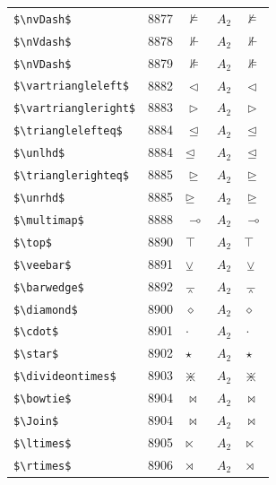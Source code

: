 ﻿\documentclass{article}
\begin{document}
\begin{table}
\begin{center}
\begin{tabular}{llll}
 \verb#$\nvDash$#           & 8877    & $\nvDash$           & $A_2\quad \nvDash$\\
 \verb#$\nVdash$#           & 8878    & $\nVdash$           & $A_2\quad \nVdash$\\
 \verb#$\nVDash$#           & 8879    & $\nVDash$           & $A_2\quad \nVDash$\\
 \verb#$\vartriangleleft$#  & 8882    & $\vartriangleleft$  & $A_2\quad \vartriangleleft$\\
 \verb#$\vartriangleright$# & 8883    & $\vartriangleright$ & $A_2\quad \vartriangleright$\\
 \verb#$\trianglelefteq$#   & 8884    & $\trianglelefteq$   & $A_2\quad \trianglelefteq$\\
 \verb#$\unlhd$#            & 8884    & $\unlhd$            & $A_2\quad \unlhd$\\
 \verb#$\trianglerighteq$#  & 8885    & $\trianglerighteq$  & $A_2\quad \trianglerighteq$\\
 \verb#$\unrhd$#            & 8885    & $\unrhd$            & $A_2\quad \unrhd$\\
 \verb#$\multimap$#         & 8888    & $\multimap$         & $A_2\quad \multimap$\\
 \verb#$\top$#              & 8890    & $\top$              & $A_2\quad \top$\\
 \verb#$\veebar$#           & 8891    & $\veebar$           & $A_2\quad \veebar$\\
 \verb#$\barwedge$#         & 8892    & $\barwedge$         & $A_2\quad \barwedge$\\
 \verb#$\diamond$#          & 8900    & $\diamond$          & $A_2\quad \diamond$\\
 \verb#$\cdot$#             & 8901    & $\cdot$             & $A_2\quad \cdot$\\
 \verb#$\star$#             & 8902    & $\star$             & $A_2\quad \star$\\
 \verb#$\divideontimes$#    & 8903    & $\divideontimes$    & $A_2\quad \divideontimes$\\
 \verb#$\bowtie$#           & 8904    & $\bowtie$           & $A_2\quad \bowtie$\\
 \verb#$\Join$#             & 8904    & $\Join$             & $A_2\quad \Join$\\
 \verb#$\ltimes$#           & 8905    & $\ltimes$           & $A_2\quad \ltimes$\\
 \verb#$\rtimes$#           & 8906    & $\rtimes$           & $A_2\quad \rtimes$\\

\end{tabular}
\end{center}
\end{table}
\end{document}
